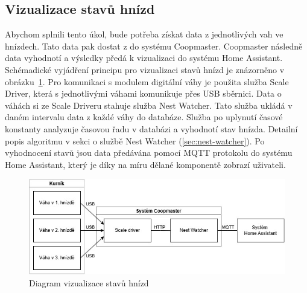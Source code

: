 \subsection{Vizualizace stavů hnízd}
Abychom splnili tento úkol, bude potřeba získat data z jednotlivých vah ve hnízdech.
Tato data pak dostat z do systému Coopmaster.
Coopmaster následně data vyhodnotí a výsledky předá k vizualizaci do systému Home Assistant.
Schémadické vyjádření principu pro vizualizaci stavů hnízd je znázorněno v obrázku~\ref{fig:vizualizace_stavu_hnizd}. \newline
Pro komunikaci s modulem digitální váhy je použita služba Scale Driver, která s jednotlivými váhami komunikuje přes USB sběrnici.
Data o váhách si ze Scale Driveru stahuje služba Nest Watcher.
Tato služba ukládá v daném intervalu data z každé váhy do databáze.
Služba po uplynutí časové konstanty analyzuje časovou řadu v databázi a vyhodnotí stav hnízda.
Detailní popis algoritmu v sekci o službě Nest Watcher (\ref{sec:nest-watcher}).
Po vyhodnocení stavů jsou data předávána pomocí MQTT protokolu do systému Home Assistant, který je díky na míru dělané komponentě zobrazí uživateli.
\begin{figure}[h]
    \centering
    \includegraphics[width=\textwidth]{img/vizualizace_stavu_hnizd}
    \caption{Diagram vizualizace stavů hnízd}
    \label{fig:vizualizace_stavu_hnizd}
\end{figure}

